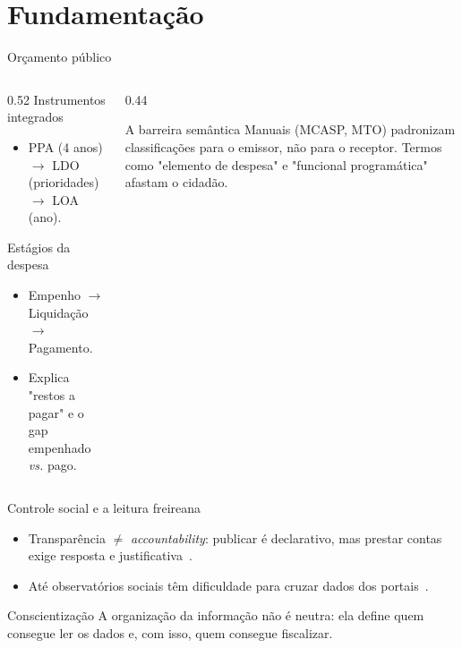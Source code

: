 \documentclass[aspectratio=169]{beamer}
\begin{document}
\section{Fundamentação}
\begin{frame}{Orçamento público}
  \begin{columns}[T]
    \begin{column}{0.52\textwidth}
      Instrumentos integrados
      \begin{itemize}\small
        \item PPA (4 anos) $\rightarrow$ LDO (prioridades) $\rightarrow$ LOA (ano).
      \end{itemize}
      \vspace{0.15cm}
      Estágios da despesa
      \begin{itemize}\small
        \item Empenho $\rightarrow$ Liquidação $\rightarrow$ Pagamento.
        \item Explica "restos a pagar" e o gap empenhado \textit{vs.} pago.
      \end{itemize}
    \end{column}
    \begin{column}{0.44\textwidth}
      \begin{block}{A barreira semântica}
        \small Manuais (MCASP, MTO) padronizam classificações para o emissor, não para o receptor. Termos como "elemento de despesa" e "funcional programática" afastam o cidadão.
      \end{block}
    \end{column}
  \end{columns}
\end{frame}

\begin{frame}{Controle social e a leitura freireana}
  \begin{itemize}
    \item Transparência $\neq$ \textit{accountability}: publicar é declarativo, mas prestar contas exige resposta e justificativa~\citep{pinho2009accountability}.
    \item Até observatórios sociais têm dificuldade para cruzar dados dos portais~\citep{marco2022transparencia}.
  \end{itemize}
  \begin{block}{Conscientização}
    A organização da informação não é neutra: ela define quem consegue ler os dados e, com isso, quem consegue fiscalizar.
  \end{block}
\end{frame}
\end{document}

